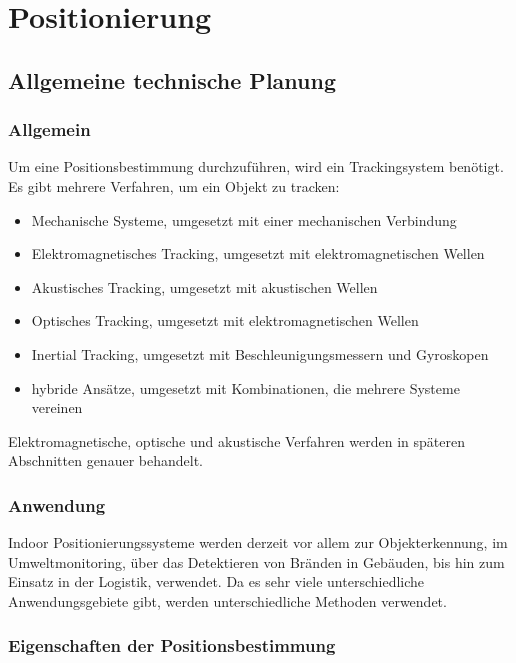 \chapter{Positionierung}
\renewcommand{\kapitelautor}{Autor: Christina Bornberg}

\section{Allgemeine technische Planung}

    \subsection{Allgemein}
    Um eine Positionsbestimmung durchzuführen, wird ein Trackingsystem benötigt.
    Es gibt mehrere Verfahren\cite{PositionAllg}, um ein Objekt zu tracken: 
    \begin{itemize}
    \item Mechanische Systeme, umgesetzt mit einer mechanischen Verbindung
    \item Elektromagnetisches Tracking, umgesetzt mit elektromagnetischen Wellen
    \item Akustisches Tracking, umgesetzt mit akustischen Wellen
    \item Optisches Tracking, umgesetzt mit elektromagnetischen Wellen
    \item Inertial Tracking, umgesetzt mit Beschleunigungsmessern und Gyroskopen
    \item hybride Ansätze, umgesetzt mit Kombinationen, die mehrere Systeme vereinen
    \end{itemize}
    Elektromagnetische, optische und akustische Verfahren werden in späteren Abschnitten genauer behandelt.

    \subsection{Anwendung}
    Indoor Positionierungssysteme werden derzeit vor allem zur Objekterkennung, im Umweltmonitoring, über das Detektieren von Bränden in Gebäuden, bis hin zum Einsatz in der Logistik, verwendet. Da es sehr viele unterschiedliche Anwendungsgebiete\cite{posAnwendung} gibt, werden unterschiedliche Methoden verwendet. 

    \subsection{Eigenschaften der Positionsbestimmung}

